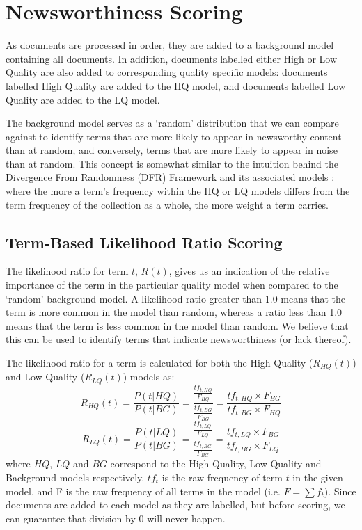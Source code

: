 
\section{Newsworthiness Scoring}
\label{scoring:sec:scoring}

As documents are processed in order, they are added to a background model containing all documents.
In addition, documents labelled either High or Low Quality are also added to corresponding quality specific models: documents labelled High Quality are added to the HQ model, and documents labelled Low Quality are added to the LQ model.

The background model serves as a `random' distribution that we can compare against to identify terms that are more likely to appear in newsworthy content than at random, and conversely, terms that are more likely to appear in noise than at random.
This concept is somewhat similar to the intuition behind the Divergence From Randomness (DFR) Framework and its associated models \citep{Amati02}: where the more a term's frequency within the HQ or LQ models differs from the term frequency of the collection as a whole, the more weight a term carries.

\subsection{Term-Based Likelihood Ratio Scoring}
\label{sec:scoring:likelihoodRatio}
The likelihood ratio for term \(t\), \(R(t)\), gives us an indication of the relative importance of the term in the particular quality model when compared to the `random' background model.
A likelihood ratio greater than 1.0 means that the term is more common in the model than random, whereas a ratio less than 1.0 means that the term is less common in the model than random.
We believe that this can be used to identify terms that indicate newsworthiness (or lack thereof).

The likelihood ratio for a term is calculated for both the High Quality (\(R_{HQ}(t)\)) and Low Quality (\(R_{LQ}(t)\)) models as:
\begin{equation}
	R_{HQ}(t) =
	\frac{
		P(t|HQ)
	}{
		P(t|BG)
	} =
	\frac{
		\frac{tf_{t,HQ}}{F_{HQ}}
	}{
		\frac{tf_{t,BG}}{F_{BG}}
	} =
	\frac{
		tf_{t,HQ} \times F_{BG}
	} {
		tf_{t,BG} \times F_{HQ}
	}
\end{equation}
\begin{equation}
	R_{LQ}(t) =
	\frac{
		P(t|LQ)
	}{
		P(t|BG)
	} =
	\frac{
		\frac{tf_{t,LQ}}{F_{LQ}}
	}{
		\frac{tf_{t,BG}}{F_{BG}}
	} =
	\frac{
		tf_{t,LQ} \times F_{BG}
	} {
		tf_{t,BG} \times F_{LQ}
	}
\end{equation}
where \(HQ\), \(LQ\) and \(BG\) correspond to the High Quality, Low Quality and Background models respectively. \(tf_t\) is the raw frequency of term  \(t\) in the given model, and F is the raw frequency of all terms in the model (i.e.  \(F = \sum{f_t}\)). Since documents are added to each model as they are labelled, but before scoring, we can guarantee that division by 0 will never happen.


